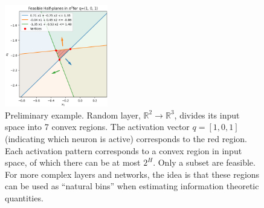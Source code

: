 \documentclass{article} %
\begin{document}
\begin{figure}[h]
    \centering
    \includegraphics[width=0.4\textwidth]{figures/regions.png}
    \caption{Preliminary example. Random layer, $\mathbb{R}^2\rightarrow\mathbb{R}^3$, divides its input space into 7 convex regions. The activation vector $q=[1,0,1]$ (indicating which neuron is active) corresponds to the red region. Each activation pattern corresponds to a convex region in input space, of which there can be at most $2^{H}$. Only a subset are feasible. For more complex layers and networks, the idea is that these regions can be used as ``natural bins'' when estimating information theoretic quantities.}
    \label{fig:regions}
\end{figure}

{\tiny}

\end{document}
